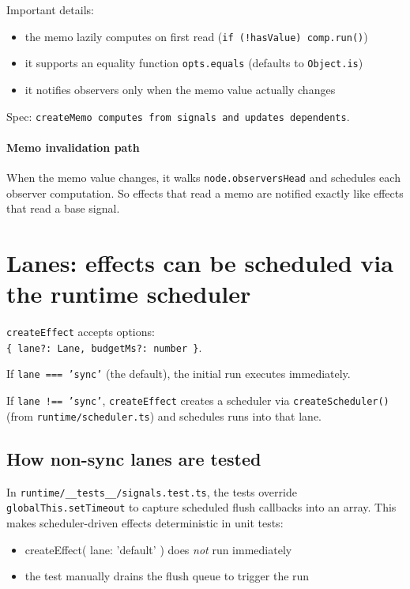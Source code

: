Important details:

\begin{itemize}
  \item the memo lazily computes on first read (\texttt{if (!hasValue) comp.run()})
  \item it supports an equality function \texttt{opts.equals} (defaults to \texttt{Object.is})
  \item it notifies observers only when the memo value actually changes
\end{itemize}

Spec: \texttt{createMemo computes from signals and updates dependents}.

\paragraph{Memo invalidation path}

When the memo value changes, it walks \texttt{node.observersHead} and schedules each observer computation.
So effects that read a memo are notified exactly like effects that read a base signal.

\section{Lanes: effects can be scheduled via the runtime scheduler}

\texttt{createEffect} accepts options:\\
\texttt{\{ lane?: Lane, budgetMs?: number \}}.

If \texttt{lane === 'sync'} (the default), the initial run executes immediately.

If \texttt{lane !== 'sync'}, \texttt{createEffect} creates a scheduler via \texttt{createScheduler()} (from \texttt{runtime/scheduler.ts}) and schedules runs into that lane.

\subsection{How non-sync lanes are tested}

In \texttt{runtime/\_\_tests\_\_/signals.test.ts}, the tests override \texttt{globalThis.setTimeout} to capture scheduled flush callbacks into an array.
This makes scheduler-driven effects deterministic in unit tests:

\begin{itemize}
  \item createEffect({ lane: 'default' }) does \emph{not} run immediately
  \item the test manually drains the flush queue to trigger the run
\end{itemize}

